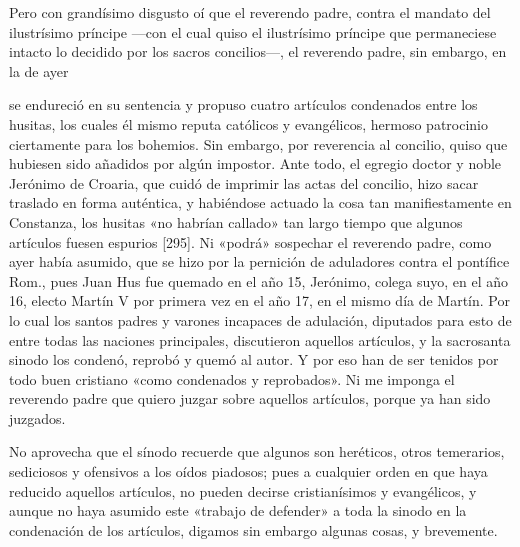 Pero con grandísimo disgusto oí que el reverendo padre, contra el mandato del ilustrísimo príncipe —con el cual quiso el ilustrísimo príncipe que permaneciese intacto lo decidido por los sacros concilios—, el reverendo padre, sin embargo, en la de ayer

se endureció en su sentencia y propuso cuatro artículos condenados entre los husitas, los cuales él mismo reputa católicos y evangélicos, hermoso patrocinio ciertamente para los bohemios. Sin embargo, por reverencia al concilio, quiso que hubiesen sido añadidos por algún impostor. Ante todo, el egregio doctor y noble Jerónimo de Croaria, que cuidó de imprimir las actas del concilio, hizo sacar traslado en forma auténtica, y habiéndose actuado la cosa tan manifiestamente en Constanza, los husitas «no habrían callado» tan largo tiempo que algunos artículos fuesen espurios [295]. Ni «podrá» sospechar el reverendo padre, como ayer había asumido, que se hizo por la pernición de aduladores contra el pontífice Rom., pues Juan Hus fue quemado en el año 15, Jerónimo, colega suyo, en el año 16, electo Martín V por primera vez en el año 17, en el mismo día de Martín. Por lo cual los santos padres y varones incapaces de adulación, diputados para esto de entre todas las naciones principales, discutieron aquellos artículos, y la sacrosanta sinodo los condenó, reprobó y quemó al autor. Y por eso han de ser tenidos por todo buen cristiano «como condenados y reprobados». Ni me imponga el reverendo padre que quiero juzgar sobre aquellos artículos, porque ya han sido juzgados.

No aprovecha que el sínodo recuerde que algunos son heréticos, otros temerarios, sediciosos y ofensivos a los oídos piadosos; pues a cualquier orden en que haya reducido aquellos artículos, no pueden decirse cristianísimos y evangélicos, y aunque no haya asumido este «trabajo de defender» a toda la sinodo en la condenación de los artículos, digamos sin embargo algunas cosas, y brevemente.


